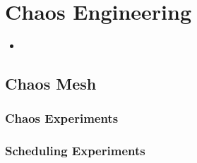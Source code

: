 \section{Chaos Engineering}

\begin{itemize}
	\item 
\end{itemize}

\subsection{Chaos Mesh} \label{background-chaos-mesh}

\subsubsection{Chaos Experiments}

\subsubsection{Scheduling Experiments}



